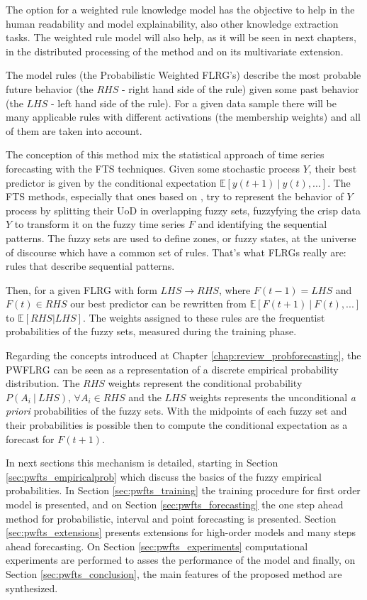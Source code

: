 The option for a weighted rule knowledge model has the objective to help in the human readability and model explainability, also other knowledge extraction tasks. The weighted rule model will also help, as it will be seen in next chapters, in the distributed processing of the method and on its multivariate extension.


The model rules (the Probabilistic Weighted FLRG's) describe the most probable future behavior (the $RHS$ - right hand side of the rule) given some past behavior (the $LHS$ - left hand side of the rule). For a given data sample there will be  many applicable rules with different activations (the membership weights) and all of them are taken into account.

The conception of this method mix the statistical approach of time series forecasting with the FTS techniques. Given some stochastic process $Y$, their best predictor is given by the conditional expectation $\mathbb{E}[y(t+1)\ |\ y(t),...]$. The FTS methods, especially that ones based on \cite{chen1996forecasting}, try to represent the behavior of $Y$ process by splitting their UoD in overlapping fuzzy sets, fuzzyfying the crisp data $Y$ to transform it on the fuzzy time series $F$ and identifying the sequential patterns.  The fuzzy sets are used to define zones, or fuzzy states, at the universe of discourse which have a common set of rules. That's what FLRGs really are: rules that describe sequential patterns. 

Then, for a given FLRG with form $LHS \rightarrow RHS$, where $F(t-1) = LHS$ and $F(t) \in RHS$ our best predictor can be rewritten from $\mathbb{E}[F(t+1)\ |\ F(t),...]$ to $\mathbb{E}[RHS|LHS]$.  The weights assigned to these rules are the frequentist probabilities of the fuzzy sets, measured during the training phase. 

Regarding the concepts introduced at Chapter \ref{chap:review_probforecasting}, the PWFLRG can be seen as a representation of a discrete empirical probability distribution.  The $RHS$ weights represent the conditional probability $P(A_i\ |\ LHS)$, $\forall A_i \in RHS$ and the $LHS$ weights represents the unconditional \textit{a priori} probabilities of the fuzzy sets. With the midpoints of each fuzzy set and their probabilities is possible then to compute the conditional expectation as a forecast for $F(t+1)$.

In next sections this mechanism is detailed, starting in Section \ref{sec:pwfts_empiricalprob} which discuss the basics of the fuzzy empirical probabilities. In Section \ref{sec:pwfts_training} the training procedure for first order model is presented, and on Section \ref{sec:pwfts_forecasting} the one step ahead method for probabilistic, interval and point forecasting is presented. Section \ref{sec:pwfts_extensions} presents extensions for high-order models and many steps ahead forecasting. On Section \ref{sec:pwfts_experiments} computational experiments are performed to asses the performance of the model and finally, on Section \ref{sec:pwfts_conclusion}, the main features of the proposed method are synthesized.  

